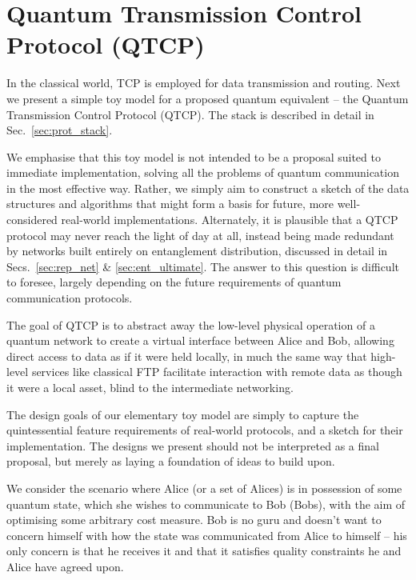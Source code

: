 %
%

\section{Quantum Transmission Control Protocol (QTCP)} \label{sec:QTCP}

In the classical world, TCP is employed for data transmission and routing. Next we present a simple toy model for a proposed quantum equivalent -- the Quantum Transmission Control Protocol (QTCP). The stack is described in detail in Sec.~\ref{sec:prot_stack}.

We emphasise that this toy model is not intended to be a proposal suited to immediate implementation, solving all the problems of quantum communication in the most effective way. Rather, we simply aim to construct a sketch of the data structures and algorithms that might form a basis for future, more well-considered real-world implementations. Alternately, it is plausible that a QTCP protocol may never reach the light of day at all, instead being made redundant by networks built entirely on entanglement distribution, discussed in detail in Secs.~\ref{sec:rep_net} \& \ref{sec:ent_ultimate}. The answer to this question is difficult to foresee, largely depending on the future requirements of quantum communication protocols.

The goal of QTCP is to abstract away the low-level physical operation of a quantum network to create a virtual interface between Alice and Bob, allowing direct access to data as if it were held locally, in much the same way that high-level services like classical FTP facilitate interaction with remote data as though it were a local asset, blind to the intermediate networking.

The design goals of our elementary toy model are simply to capture the quintessential feature requirements of real-world protocols, and a sketch for their implementation. The designs we present should not be interpreted as a final proposal, but merely as laying a foundation of ideas to build upon.

We consider the scenario where Alice (or a set of Alices) is in possession of some quantum state, which she wishes to communicate to Bob (Bobs), with the aim of optimising some arbitrary cost measure. Bob is no guru and doesn't want to concern himself with how the state was communicated from Alice to himself -- his only concern is that he receives it and that it satisfies quality constraints he and Alice have agreed upon.

